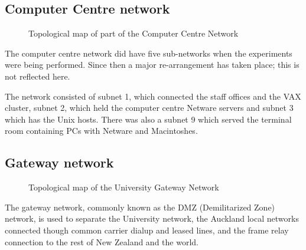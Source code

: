 \subsection{Computer Centre network}

\begin{figure}
\leavevmode
{}
\caption{Topological map of part of the Computer Centre Network}
\label{map:ccnet}
\end{figure}

The computer centre network did have five sub-networks when the
experiments were being performed.  Since then a major re-arrangement
has taken place; this is not reflected here.

The network consisted of subnet 1, which connected the staff offices
and the VAX cluster, subnet 2, which held the computer centre Netware
servers and subnet 3 which has the Unix hosts.  There was also a
subnet 9 which served the terminal room containing PCs with Netware
and Macintoshes.

\subsection{Gateway network}

\begin{figure}
\leavevmode
{}
\caption{Topological map of the University Gateway Network}
\label{map:dmz}
\end{figure}

The gateway network, commonly known as the DMZ (Demilitarized Zone)
network, is used to separate the University network, the Auckland
local networks connected though common carrier dialup and leased
lines, and the frame relay connection to the rest of New Zealand and
the world.
